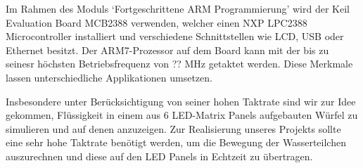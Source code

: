 Im Rahmen des Moduls `Fortgeschrittene ARM Programmierung' wird der Keil Evaluation Board MCB2388 verwenden, welcher einen NXP LPC2388 Microcontroller installiert und verschiedene Schnittstellen wie LCD, USB oder Ethernet besitzt. Der ARM7-Prozessor auf dem Board kann mit der bis zu seinesr höchsten Betriebsfrequenz von ?? MHz getaktet werden. Diese Merkmale lassen unterschiedliche Applikationen umsetzen.

Insbesondere unter Berücksichtigung von seiner hohen Taktrate sind wir zur Idee gekommen, Flüssigkeit in einem aus 6 LED-Matrix Panels aufgebauten Würfel zu simulieren und auf denen anzuzeigen. Zur Realisierung unseres Projekts sollte eine sehr hohe Taktrate benötigt werden, um die Bewegung der Wasserteilchen auszurechnen und diese auf den LED Panels in Echtzeit zu übertragen.

